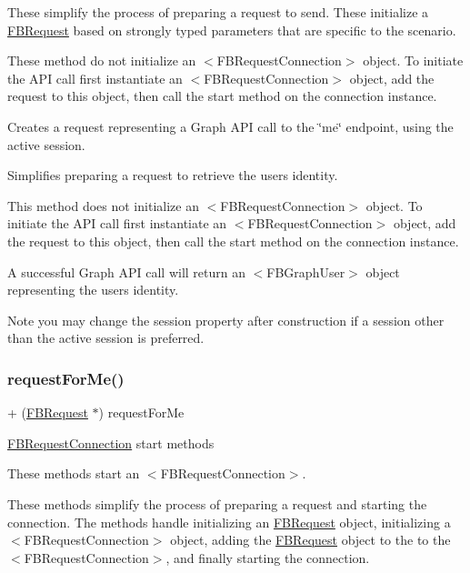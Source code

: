 These simplify the process of preparing a request to send. These initialize a {\ttfamily \hyperlink{interfaceFBRequest}{F\+B\+Request}} based on strongly typed parameters that are specific to the scenario.

These method do not initialize an $<$\+F\+B\+Request\+Connection$>$ object. To initiate the A\+PI call first instantiate an $<$\+F\+B\+Request\+Connection$>$ object, add the request to this object, then call the {\ttfamily start} method on the connection instance.

Creates a request representing a Graph A\+PI call to the \char`\"{}me\char`\"{} endpoint, using the active session.

Simplifies preparing a request to retrieve the user\textquotesingle{}s identity.

This method does not initialize an $<$\+F\+B\+Request\+Connection$>$ object. To initiate the A\+PI call first instantiate an $<$\+F\+B\+Request\+Connection$>$ object, add the request to this object, then call the {\ttfamily start} method on the connection instance.

A successful Graph A\+PI call will return an $<$\+F\+B\+Graph\+User$>$ object representing the user\textquotesingle{}s identity.

Note you may change the session property after construction if a session other than the active session is preferred. \mbox{\label{interfaceFBRequest_a1a8fb083c2d09cbbc5ae9afd33e2381f}} 
\subsubsection{\texorpdfstring{request\+For\+Me()}{requestForMe()}\hspace{0.1cm}{\footnotesize\ttfamily [4/5]}}
{\footnotesize\ttfamily + (\hyperlink{interfaceFBRequest}{F\+B\+Request} $\ast$) request\+For\+Me \begin{DoxyParamCaption}{ }\end{DoxyParamCaption}}

\hyperlink{interfaceFBRequestConnection}{F\+B\+Request\+Connection} start methods

These methods start an $<$\+F\+B\+Request\+Connection$>$.

These methods simplify the process of preparing a request and starting the connection. The methods handle initializing an {\ttfamily \hyperlink{interfaceFBRequest}{F\+B\+Request}} object, initializing a $<$\+F\+B\+Request\+Connection$>$ object, adding the {\ttfamily \hyperlink{interfaceFBRequest}{F\+B\+Request}} object to the to the $<$\+F\+B\+Request\+Connection$>$, and finally starting the connection.

